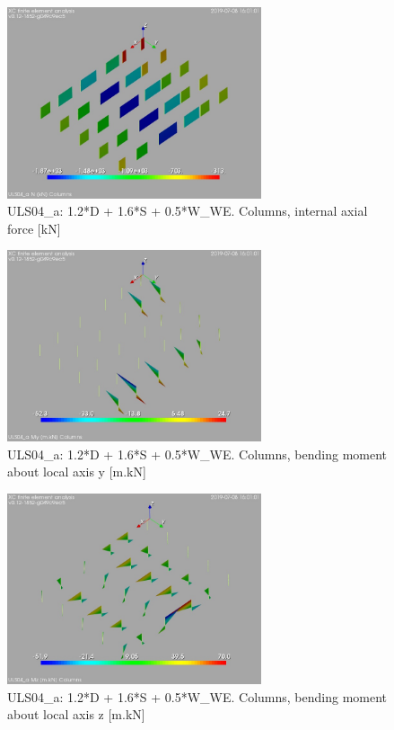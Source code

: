 \begin{figure}
\begin{center}
\includegraphics[width=75mm]{annex_res_columns/graphics/resSimplLC/ULS04_acolumnsN}
\caption{ULS04\_a: 1.2*D + 1.6*S + 0.5*W\_WE. Columns, internal axial force [kN]}
\end{center}
\end{figure}
\begin{figure}
\begin{center}
\includegraphics[width=75mm]{annex_res_columns/graphics/resSimplLC/ULS04_acolumnsMy}
\caption{ULS04\_a: 1.2*D + 1.6*S + 0.5*W\_WE. Columns, bending moment about local axis y [m.kN]}
\end{center}
\end{figure}
\begin{figure}
\begin{center}
\includegraphics[width=75mm]{annex_res_columns/graphics/resSimplLC/ULS04_acolumnsMz}
\caption{ULS04\_a: 1.2*D + 1.6*S + 0.5*W\_WE. Columns, bending moment about local axis z [m.kN]}
\end{center}
\end{figure}


